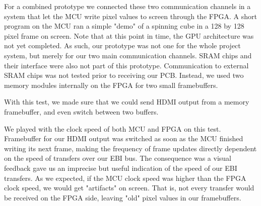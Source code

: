 For a combined prototype we connected these two communication channels in a system that let the MCU write pixel values to screen through the FPGA.
A short program on the MCU ran a simple "demo" of a spinning cube in a 128 by 128 pixel frame on screen.
Note that at this point in time, the GPU architecture was not yet completed.
As such, our prototype was not one for the whole project system, but merely for our two main communication channels.
SRAM chips and their interface were also not part of this prototype.
Communication to external SRAM chips was not tested prior to receiving our PCB.
Instead, we used two memory modules internally on the FPGA for two small framebuffers.

With this test, we made sure that we could send HDMI output from a memory framebuffer, and even switch between two buffers. 

We played with the clock speed of both MCU and FPGA on this test.
Framebuffer for our HDMI output was switched as soon as the MCU finished writing its next frame, making the frequency of frame updates directly dependent on the speed of transfers over our EBI bus.
The consequence was a visual feedback gave us an imprecise but useful indication of the speed of our EBI transfers.
As we expected, if the MCU clock speed was higher than the FPGA clock speed, we would get "artifacts" on screen.
That is, not every transfer would be received on the FPGA side, leaving "old" pixel values in our framebuffers.
